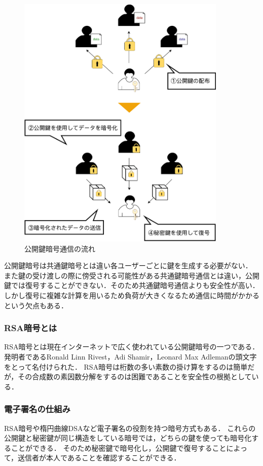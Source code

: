 \documentclass[a4j,12pt]{jsarticle}
\begin{document}
\begin{figure}[H]
\centering
\includegraphics[width=10cm]{kokai.pdf}
\caption{公開鍵暗号通信の流れ}
\label{fig:no}
\end{figure} 

公開鍵暗号は共通鍵暗号とは違い各ユーザーごとに鍵を生成する必要がない．
また鍵の受け渡しの際に傍受される可能性がある共通鍵暗号通信とは違い，公開鍵では復号することができない．そのため共通鍵暗号通信よりも安全性が高い．しかし復号に複雑な計算を用いるため負荷が大きくなるため通信に時間がかかるという欠点もある．



\subsubsection{RSA暗号とは}
RSA暗号とは現在インターネットで広く使われている公開鍵暗号の一つである．
発明者であるRonald Linn Rivest，Adi Shamir，Leonard Max Adlemanの頭文字をとって名付けられた．
RSA暗号は桁数の多い素数の掛け算をするのは簡単だが，その合成数の素因数分解をするのは困難であることを安全性の根拠としている．


\subsubsection{電子署名の仕組み}

RSA暗号や楕円曲線DSAなど電子署名の役割を持つ暗号方式もある．
これらの公開鍵と秘密鍵が同じ構造をしている暗号では，どちらの鍵を使っても暗号化することができる．
そのため秘密鍵で暗号化し，公開鍵で復号することによって，送信者が本人であることを確認することができる．
\end{document}

